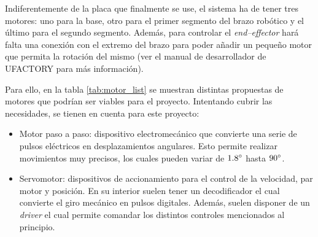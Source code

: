 Indiferentemente de la placa que finalmente se use, el sistema ha de tener tres motores: uno para la base, otro para el primer segmento del brazo robótico y el último para el segundo segmento. Además, para controlar el \textit{end--effector} hará falta una conexión con el extremo del brazo para poder añadir un pequeño motor que permita la rotación del mismo (ver el manual de desarrollador de UFACTORY para más información).

Para ello, en la tabla \ref{tab:motor_list} se muestran distintas propuestas de motores que podrían ser viables para el proyecto. Intentando cubrir las necesidades, se tienen en cuenta para este proyecto:

\begin{itemize}
    \item Motor paso a paso: dispositivo electromecánico que convierte una serie de pulsos eléctricos en desplazamientos angulares. Esto permite realizar movimientos muy precisos, los cuales pueden variar de $1.8\degree$ hasta $90\degree$.
    \item Servomotor: dispositivos de accionamiento para el control de la velocidad, par motor y posición. En su interior suelen tener un decodificador el cual convierte el giro mecánico en pulsos digitales. Además, suelen disponer de un \textit{driver} el cual permite comandar los distintos controles mencionados al principio.
\end{itemize}

